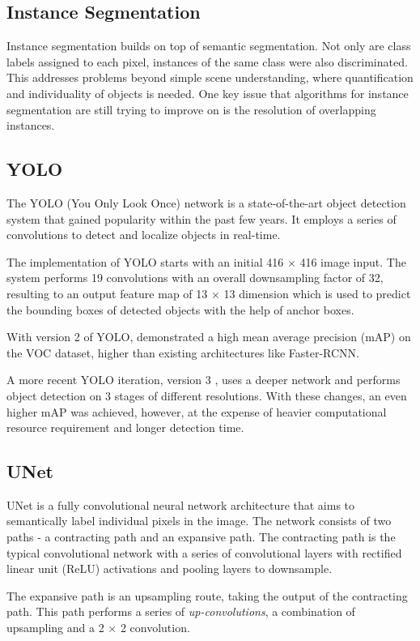 \documentclass[10pt, journal, compsoc]{IEEEtran}
\begin{document}
\subsection{Instance Segmentation}
Instance segmentation builds on top of semantic segmentation. Not only are class labels assigned to each pixel, instances of the same class were also discriminated. This addresses problems beyond simple scene understanding, where quantification and individuality of objects is needed. One key issue that algorithms for instance segmentation are still trying to improve on is the resolution of overlapping instances.
\subsection{YOLO}
The YOLO (You Only Look Once) network \cite{redmon2016yolo9000} is a state-of-the-art object detection system that gained popularity within the past few years. It employs a series of convolutions to detect and localize objects in real-time.

The implementation of YOLO starts with an initial 416 $\times$ 416 image input. The system performs 19 convolutions with an overall downsampling factor of 32, resulting to an output feature map of 13 $\times$ 13 dimension which is used to predict the bounding boxes of detected objects with the help of anchor boxes.

With version 2 of YOLO, \cite{redmon2016yolo9000} demonstrated a high mean average precision (mAP) on the VOC dataset, higher than existing architectures like Faster-RCNN.

A more recent YOLO iteration, version 3 \cite{yolov3}, uses a deeper network and performs object detection on 3 stages of different resolutions. With these changes, an even higher mAP was achieved, however, at the expense of heavier computational resource requirement and longer detection time.
\subsection{UNet}
UNet\cite{RFB15a} is a fully convolutional neural network architecture that aims to semantically label individual pixels in the image. The network consists of two paths - a contracting path and an expansive path. The contracting path is the typical convolutional network with a series of convolutional layers with rectified linear unit (ReLU) activations and pooling layers to downsample.

The expansive path is an upsampling route, taking the output of the contracting path. This path performs a series of \textit{up-convolutions}, a combination of upsampling and a 2 $\times$ 2 convolution.
\end{document}
